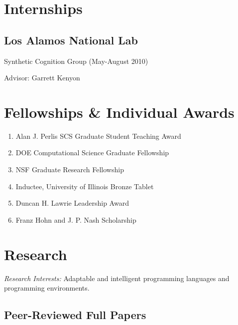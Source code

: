 \documentclass[10pt,letterpaper]{article}
\renewenvironment{itemize}{
  \begin{list}{}{
    \setlength{\leftmargin}{1.5em}
    \setlength{\itemsep}{0.25em}
    \setlength{\parskip}{0pt}
    \setlength{\parsep}{0.25em}
  }
}{
  \end{list}
}
\begin{document}
\section*{Internships}
\subsection*{Los Alamos National Lab}
  \begin{itemize}
    \item Synthetic Cognition Group (May-August 2010)
    \item Advisor: Garrett Kenyon
  \end{itemize}

  \section*{Fellowships \& Individual Awards}
\begin{enumerate}
  \item {Alan J. Perlis SCS Graduate Student Teaching Award}%
  \item DOE Computational Science Graduate Fellowship %
  \item NSF Graduate Research Fellowship %
  \item Inductee, University of Illinois Bronze Tablet %
  \item Duncan H. Lawrie Leadership Award %
  \item Franz Hohn and J. P. Nash Scholarship
\end{enumerate}


\section*{Research}

\textit{Research Interests:} Adaptable and intelligent programming languages and programming environments.

\vspace{-6px}
\subsection*{Peer-Reviewed Full Papers}
\end{document}
